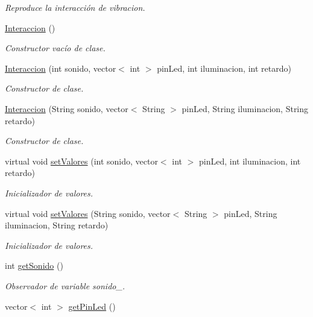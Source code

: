 \begin{DoxyCompactItemize}
\begin{DoxyCompactList}\small\item\em Reproduce la interacción de vibracion. \end{DoxyCompactList}\item 
\hyperlink{classInteraccion_a8a59812401c3a6dbe06b424e537be173}{Interaccion} ()
\begin{DoxyCompactList}\small\item\em Constructor vacío de clase. \end{DoxyCompactList}\item 
\hyperlink{classInteraccion_a2019332345e3420911cc156395a47f58}{Interaccion} (int sonido, vector$<$ int $>$ pin\+Led, int iluminacion, int retardo)
\begin{DoxyCompactList}\small\item\em Constructor de clase. \end{DoxyCompactList}\item 
\hyperlink{classInteraccion_aa1f774cfdca0e31205f370a5a3c0bfb4}{Interaccion} (String sonido, vector$<$ String $>$ pin\+Led, String iluminacion, String retardo)
\begin{DoxyCompactList}\small\item\em Constructor de clase. \end{DoxyCompactList}\item 
virtual void \hyperlink{classInteraccion_a468b7652bf7e2a4f41bda41f6b0f8481}{set\+Valores} (int sonido, vector$<$ int $>$ pin\+Led, int iluminacion, int retardo)
\begin{DoxyCompactList}\small\item\em Inicializador de valores. \end{DoxyCompactList}\item 
virtual void \hyperlink{classInteraccion_a6727e1e312fd6c8d2eef72c56015115d}{set\+Valores} (String sonido, vector$<$ String $>$ pin\+Led, String iluminacion, String retardo)
\begin{DoxyCompactList}\small\item\em Inicializador de valores. \end{DoxyCompactList}\item 
int \hyperlink{classInteraccion_a2dea5d3d96252712556e7d8ca5609544}{get\+Sonido} ()
\begin{DoxyCompactList}\small\item\em Observador de variable sonido\+\_\+. \end{DoxyCompactList}\item 
vector$<$ int $>$ \hyperlink{classInteraccion_a048731e6be4184f31ecd21cd443f36dc}{get\+Pin\+Led} ()

\end{DoxyCompactItemize}
